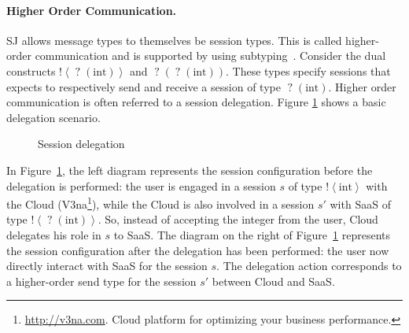 \documentclass{llncs}
\begin{document}
\paragraph{Higher Order Communication.}

SJ allows message types to themselves be session types. This is called higher-order communication and is supported by using subtyping~\cite{higher-order-comm}.
Consider the dual constructs $\mathopen{!}\left<\mathopen{?}\left(\text{int}\right)\right>$ and $\mathopen{?}\left(\mathopen{?}\left(\text{int}\right)\right)$. 
These types specify sessions that expects to respectively send and receive a session of type $\mathopen{?}\left(\text{int}\right)$.
Higher order communication is often referred to a session delegation. Figure \ref{fig:sj-delegation} shows a basic delegation scenario.
%
\begin{figure}[ht]
\centering
{}
\caption{Session delegation}\label{fig:sj-delegation}
\end{figure}

In Figure~\ref{fig:sj-delegation}, the left diagram represents the session configuration before the delegation is performed: the user is engaged in a session $s$ of type $\mathopen{!}\left<\text{int}\right>$ with the Cloud (V3na\footnote{\url{http://v3na.com}. Cloud platform for optimizing your business performance.}), while the Cloud is also involved in a session $s'$ with SaaS of type $\mathopen{!}\left<\mathopen{?}\left(\text{int}\right)\right>$. So, instead of accepting the integer from the user, Cloud delegates his role in $s$ to SaaS.
The diagram on the right of Figure~\ref{fig:sj-delegation} represents the session configuration after the delegation has been performed: the user now directly interact with SaaS for the session $s$.
The delegation action corresponds to a higher-order send type for the session $s'$ between Cloud and SaaS.
\end{document}
